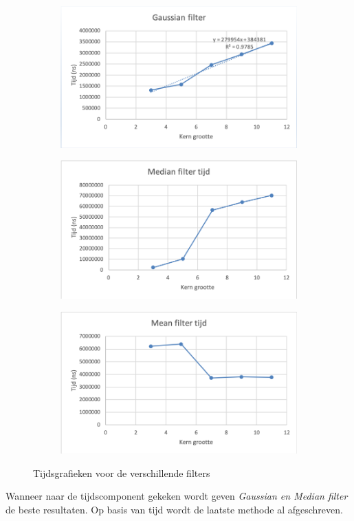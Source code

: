 \begin{figure}[h!]
  \centering
  \begin{subfigure}{0.4\linewidth}
    \includegraphics[width=\linewidth]{img/gaussiantijd}
  \end{subfigure}
  \begin{subfigure}{0.4\linewidth}
    \includegraphics[width=\linewidth]{img/mediantijd}
  \end{subfigure}
  \begin{subfigure}{0.4\linewidth}
    \includegraphics[width=\linewidth]{img/meantijd}
  \end{subfigure}
  \caption{Tijdsgrafieken voor de verschillende filters}
  \label{fig:tijdsgrafieken}
\end{figure}

Wanneer naar de tijdscomponent gekeken wordt geven \textit{Gaussian en Median filter} de beste resultaten. 
Op basis van tijd wordt de laatste methode al afgeschreven. 



